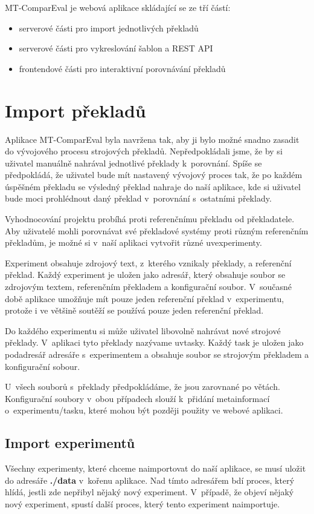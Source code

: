 MT-ComparEval je webová aplikace skládající se ze tří částí:

\begin{itemize}
	\item serverové části pro import jednotlivých překladů
	\item serverové části pro vykreslování šablon a REST API
	\item frontendové části pro interaktivní porovnávání překladů
\end{itemize}

\section{Import překladů}
Aplikace MT-ComparEval byla navržena tak,
  aby ji bylo možné snadno zasadit do vývojového procesu strojových překladů.
Nepředpokládali jsme,
  že by si uživatel manuálně nahrával jednotlivé překlady k~porovnání.
Spíše se předpokládá, že uživatel bude mít nastavený vývojový proces tak,
  že po každém úspěšném překladu se výsledný překlad nahraje do naší aplikace,
  kde si uživatel bude moci prohlédnout daný překlad v~porovnání s~ostatními překlady.

Vyhodnocování projektu probíhá proti referenčnímu překladu od překladatele.
Aby uživatelé mohli porovnávat své překladové systémy proti různým referenčním překladům,
  je možné si v~naší aplikaci vytvořit různé uv{experimenty}. 

Experiment obsahuje zdrojový text, z~kterého vznikaly překlady, a referenční překlad.
Každý experiment je uložen jako adresář,
  který obsahuje soubor se zdrojovým textem, referenčním překladem
  a konfigurační soubor.
V~současné době aplikace umožňuje mít pouze jeden referenční překlad v~experimentu,
  protože i ve většině soutěží se používá pouze jeden referenční překlad.

Do každého experimentu si může uživatel libovolně nahrávat nové strojové překlady.
V~aplikaci tyto překlady nazývame uv{tasky}.
Každý task je uložen jako podadresář adresáře s~experimentem
  a obsahuje soubor se strojovým překladem
  a konfigurační sobour. 

U~všech souborů s~překlady předpokládáme, že jsou zarovnané po větách.
Konfigurační soubory v~obou případech slouží k~přidání metainformací o~experimentu/tasku,
  které mohou být později použity ve webové aplikaci.

\subsection{Import experimentů}
Všechny experimenty, které chceme naimportovat do naší aplikace,
  se musí uložit do adresáře \textbf{./data} v~kořenu aplikace.
Nad tímto adresářem bdí proces, který hlídá,
  jestli zde nepřibyl nějaký nový experiment.
V~případě, že objeví nějaký nový experiment,
  spustí další proces, který tento experiment naimportuje.

